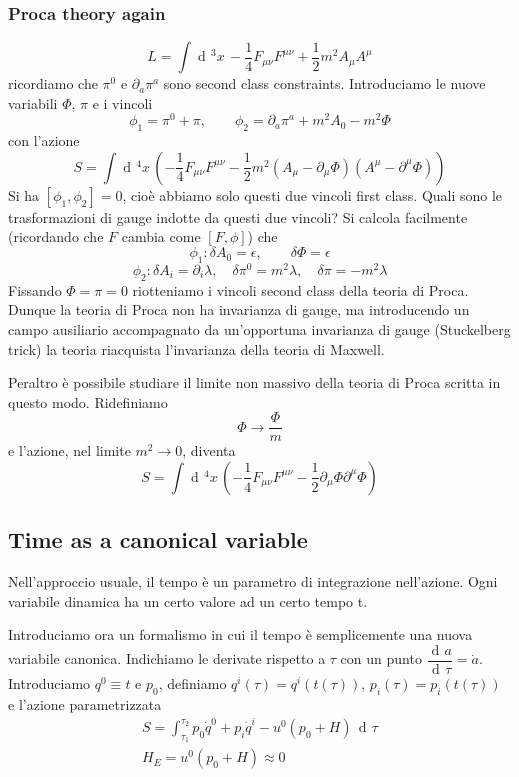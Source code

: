 \documentclass[a4paper, 11pt]{article}
\newcommand{\dd}{\mathop{\mathrm{d}\!}{}}
\newcommand{\deriv}[2]{\dfrac{\dd #1}{\dd #2}}
\begin{document}
	\subsubsection{Proca theory again}
	\[ L = \int \dd^3 x\, -\dfrac{1}{4} F_{\mu\nu}F^{\mu\nu} + \dfrac{1}{2} m^2 A_\mu A^\mu \]
	ricordiamo che $\pi^0$ e $\partial_a \pi^a$ sono second class constraints. Introduciamo le nuove variabili $\Phi$, $\pi$ e i vincoli
	\[ \phi_1 = \pi^0 + \pi,\qquad \phi_2 = \partial_a \pi^a + m^2 A_0 - m^2 \Phi \]
	con l'azione
	\[ S = \int \dd^4 x\, \left( -\dfrac{1}{4} F_{\mu\nu} F^{\mu\nu} - \dfrac{1}{2} m^2 (A_\mu - \partial_\mu \Phi)(A^\mu - \partial^\mu \Phi) \right) \]
	Si ha $[\phi_1, \phi_2] = 0$, cioè abbiamo solo questi due vincoli first class. Quali sono le trasformazioni di gauge indotte da questi due vincoli? Si calcola facilmente (ricordando che $F$ cambia come $[F, \phi]$) che
	\[ \phi_1: \delta A_0 = \epsilon,\qquad \delta \Phi = \epsilon \]
	\[ \phi_2: \delta A_i = \partial_i\lambda,\quad \delta \pi^0 = m^2\lambda,\quad 
	\delta \pi = -m^2 \lambda \]
	Fissando $\Phi=\pi = 0$ riotteniamo i vincoli second class della teoria di Proca. Dunque la teoria di Proca non ha invarianza di gauge, ma introducendo un campo ausiliario accompagnato da un'opportuna invarianza di gauge (Stuckelberg trick) la teoria riacquista l'invarianza della teoria di Maxwell.
	
	Peraltro è possibile studiare il limite non massivo della teoria di Proca scritta in questo modo. Ridefiniamo
	\[ \Phi \rightarrow \dfrac{\Phi}{m} \]
	e l'azione, nel limite $m^2\rightarrow 0$, diventa
	\[ S = \int \dd^4 x\, \left( -\dfrac{1}{4} F_{\mu\nu} F^{\mu\nu} - \dfrac{1}{2} \partial_\mu \Phi \partial^\mu \Phi \right) \]
	
	
	\subsection{Time as a canonical variable}
	Nell'approccio usuale, il tempo è un parametro di integrazione nell'azione. Ogni variabile dinamica ha un certo valore ad un certo tempo t.
	
	Introduciamo ora un formalismo in cui il tempo è semplicemente una nuova variabile canonica. Indichiamo le derivate rispetto a $\tau$ con un punto $\deriv{a}{\tau} = \dot{a}$. Introduciamo $q^0\equiv t$ e $p_0$, definiamo $q^i(\tau) = q^i(t(\tau))$, $p_i(\tau) = p_i(t(\tau))$ e l'azione parametrizzata
	\begin{eqnarray}
	S = \int_{\tau_1}^{\tau_2} p_0\dot{q}^0 + p_i \dot{q}^i - u^0(p_0+H)\, \dd \tau \\
	H_E = u^0(p_0+H) \approx 0
	\end{eqnarray}
	
\end{document}
